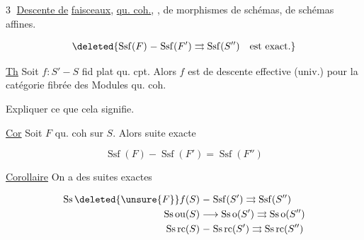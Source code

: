 
\textcircled{3} \uline{Descente de}  \uline{faisceaux},   \uline{qu. coh.},  , de morphismes de schémas, de schémas affines.


\[
\deleted{\operatorname{Ssf}(F)\mathrel{-}\operatorname{Ssf}(F')\rightrightarrows\operatorname{Ssf}(S'')\quad\text{est exact.}}
\]



\uline{Th} Soit $f:S'\mathrel{-}S$ fid plat qu. cpt. Alors $f$ est de descente effective (univ.) pour la catégorie fibrée des Modules qu. coh.

Expliquer ce que cela signifie.

\uline{Cor}  Soit $F$ qu. coh sur $S$. Alors suite exacte

\[
\operatorname{Ssf}(F)\mathrel{-}\operatorname{Ssf}(F')=\operatorname{Ssf}(F'')
\]

\uline{Corollaire} On a des suites exactes


\[
\begin{aligned}
 \operatorname{Ss}\deleted{\unsure{F}}f(S)&\mathrel{-}\operatorname{Ssf}(S')\rightrightarrows\operatorname{Ssf}(S'')\\
 \operatorname{Ss\,ou}(S)&\longrightarrow\operatorname{Ss\,o}(S')\rightrightarrows\operatorname{Ss\,o}(S'')\\
 \operatorname{Ss\,rc}(S)&\mathrel{-}\operatorname{Ss\,rc}(S')\rightrightarrows\operatorname{Ss\,rc}(S'')
\end{aligned}
\]



